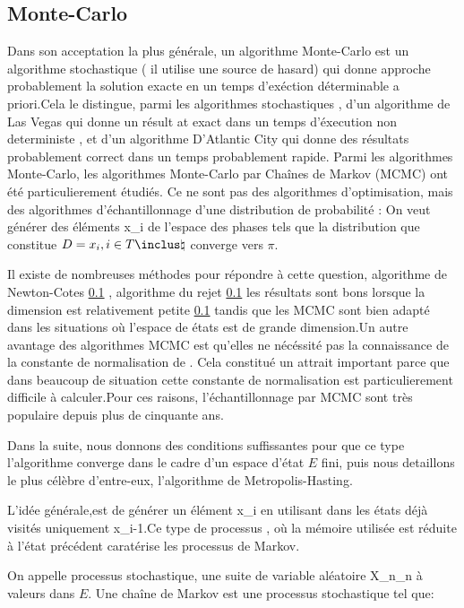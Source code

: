 \subsection{Monte-Carlo}

Dans son acceptation la plus générale, un algorithme Monte-Carlo est un algorithme stochastique ( il utilise une source de hasard) qui donne approche probablement la solution exacte en un temps d'exéction déterminable a priori.Cela le distingue, parmi les algorithmes stochastiques , d'un algorithme de Las Vegas qui donne un résult
at exact dans un temps d'éxecution non deterministe , et d'un algorithme D'Atlantic City qui donne des résultats probablement correct dans un temps probablement rapide.
Parmi les algorithmes Monte-Carlo, les algorithmes Monte-Carlo par Chaînes de Markov (MCMC) ont été particulierement étudiés.
Ce ne sont pas des algorithmes d'optimisation, mais des algorithmes d'échantillonnage d'une distribution de probabilité \pi: On veut générer des éléments x_i de l'espace des phases tels que la distribution que constitue $D={x_i, i \in T \inclus \natural}$ converge vers $\pi$.

Il existe de nombreuses méthodes pour répondre à cette question, algorithme de Newton-Cotes \ref{} , algorithme du rejet \ref{} les résultats sont bons lorsque la dimension est relativement petite \ref{} tandis que les MCMC sont bien adapté dans les situations où l'espace de états est de grande dimension.Un autre avantage des algorithmes MCMC est qu'elles ne nécéssité pas la connaissance de la constante de normalisation de \pi. Cela constitué un attrait important parce que dans beaucoup de situation cette constante de normalisation est particulierement difficile à calculer.Pour ces raisons, l'échantillonnage par MCMC sont très populaire depuis plus de cinquante ans.

Dans la suite, nous donnons des conditions suffissantes pour que ce type l'algorithme converge dans le cadre d'un espace d'état $E$ fini, puis nous detaillons le plus célèbre d'entre-eux, l'algorithme de Metropolis-Hasting.

L'idée générale,est de générer un élément x_i en utilisant dans les états déjà visités uniquement x_{i-1}.Ce type de processus , où la mémoire utilisée est réduite à l'état précédent caratérise les processus de Markov.


On appelle processus stochastique, une suite de variable aléatoire {X_n}_{n} à valeurs dans $E$.
Une chaîne de Markov est une processus stochastique tel que:

